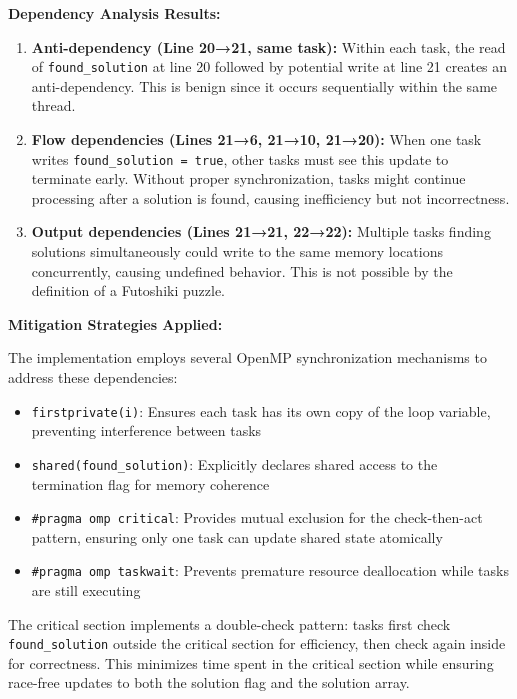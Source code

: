 \textbf{Dependency Analysis Results:}

\begin{enumerate}
    \item \textbf{Anti-dependency (Line 20→21, same task):} Within each task, the read of \texttt{found\_solution} at line 20 followed by potential write at line 21 creates an anti-dependency. This is benign since it occurs sequentially within the same thread.
    
    \item \textbf{Flow dependencies (Lines 21→6, 21→10, 21→20):} When one task writes \texttt{found\_solution = true}, other tasks must see this update to terminate early. Without proper synchronization, tasks might continue processing after a solution is found, causing inefficiency but not incorrectness.
    
    \item \textbf{Output dependencies (Lines 21→21, 22→22):} Multiple tasks finding solutions simultaneously could write to the same memory locations concurrently, causing undefined behavior. This is not possible by the definition of a Futoshiki puzzle.
\end{enumerate}

\textbf{Mitigation Strategies Applied:}

The implementation employs several OpenMP synchronization mechanisms to address these dependencies:

\begin{itemize}
    \item \texttt{firstprivate(i)}: Ensures each task has its own copy of the loop variable, preventing interference between tasks
    \item \texttt{shared(found\_solution)}: Explicitly declares shared access to the termination flag for memory coherence
    \item \texttt{\#pragma omp critical}: Provides mutual exclusion for the check-then-act pattern, ensuring only one task can update shared state atomically
    \item \texttt{\#pragma omp taskwait}: Prevents premature resource deallocation while tasks are still executing
\end{itemize}

The critical section implements a double-check pattern: tasks first check \texttt{found\_solution} outside the critical section for efficiency, then check again inside for correctness. This minimizes time spent in the critical section while ensuring race-free updates to both the solution flag and the solution array.

